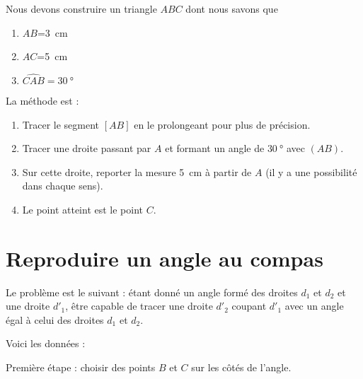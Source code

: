 Nous devons construire un triangle \( ABC\) dont nous savons que
\begin{enumerate}
    \item
        \( AB\)=\SI{3}{\centi\meter}
    \item
        \( AC\)=\SI{5}{\centi\meter}
    \item
        \( \widehat{CAB}=\SI{30}{\degree}\)
\end{enumerate}

La méthode est :
\begin{enumerate}
    \item
        Tracer le segment \( [AB]\) en le prolongeant pour plus de précision.
    \item
        Tracer une droite passant par \( A\) et formant un angle de \( \SI{30}{\degree}\) avec \( (AB)\).
    \item
        Sur cette droite, reporter la mesure \SI{5}{\centi\meter} à partir de \( A\) (il y a une possibilité dans chaque sens).
    \item
        Le point atteint est le point \( C\).
\end{enumerate}

\section{Reproduire un angle au compas}

Le problème est le suivant : étant donné un angle formé des droites \( d_1\) et \( d_2\) et une droite \( d'_1\), être capable de tracer une droite \( d'_2\) coupant \( d'_1\) avec un angle égal à celui des droites \( d_1\) et \( d_2\).



Voici les données :

\begin{center}
   
\end{center}


Première étape : choisir des points \( B\) et \( C\) sur les côtés de l'angle.

\begin{center}
   
\end{center}

